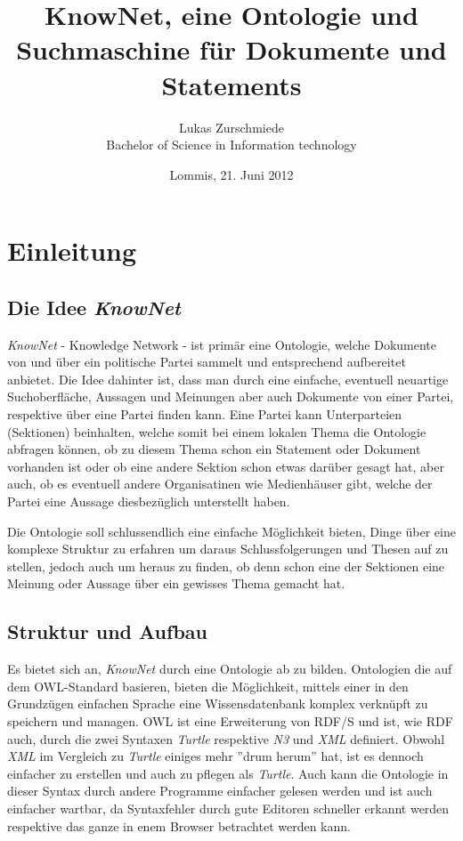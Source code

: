 \documentclass[
    11pt,
    latin1,
    a4paper,
    oneside
]{scrreprt}
\author{Lukas Zurschmiede\\Bachelor of Science in Information technology}
\date{Lommis, 21. Juni 2012}
\title{KnowNet, eine Ontologie und Suchmaschine f\"ur Dokumente und Statements}
\begin{document}
\maketitle

\newpage
\singlespacing
\tableofcontents

\pagebreak
\onehalfspacing
\setcounter{page}{1}

\chapter{Einleitung} \label{sec:introduction}

\section{Die Idee \emph{KnowNet}}

\emph{KnowNet} - Knowledge Network - ist prim\"ar eine Ontologie, welche Dokumente von und \"uber ein politische Partei sammelt und entsprechend aufbereitet anbietet. Die Idee dahinter ist, dass man durch eine einfache, eventuell neuartige Suchoberfl\"ache, Aussagen und Meinungen aber auch Dokumente von einer Partei, respektive \"uber eine Partei finden kann. Eine Partei kann Unterparteien (Sektionen) beinhalten, welche somit bei einem lokalen Thema die Ontologie abfragen k\"onnen, ob zu diesem Thema schon ein Statement oder Dokument vorhanden ist oder ob eine andere Sektion schon etwas dar\"uber gesagt hat, aber auch, ob es eventuell andere Organisatinen wie Medienh\"auser gibt, welche der Partei eine Aussage diesbez\"uglich unterstellt haben.

Die Ontologie soll schlussendlich eine einfache M\"oglichkeit bieten, Dinge \"uber eine komplexe Struktur zu erfahren um daraus Schlussfolgerungen und Thesen auf zu stellen, jedoch auch um heraus zu finden, ob denn schon eine der Sektionen eine Meinung oder Aussage \"uber ein gewisses Thema gemacht hat.

\section{Struktur und Aufbau} \label{sec:structure}

Es bietet sich an, \emph{KnowNet} durch eine Ontologie ab zu bilden. Ontologien die auf dem OWL-Standard\cite{W3COWL} basieren, bieten die M\"oglichkeit, mittels einer in den Grundz\"ugen einfachen Sprache eine Wissensdatenbank komplex verkn\"upft zu speichern und managen. OWL ist eine Erweiterung von RDF/S und ist, wie RDF auch, durch die zwei Syntaxen \emph{Turtle} respektive \emph{N3} und \emph{XML} definiert. Obwohl \emph{XML} im Vergleich zu \emph{Turtle} einiges mehr ''drum herum'' hat, ist es dennoch einfacher zu erstellen und auch zu pflegen als \emph{Turtle}. Auch kann die Ontologie in dieser Syntax durch andere Programme einfacher gelesen werden und ist auch einfacher wartbar, da Syntaxfehler durch gute Editoren schneller erkannt werden respektive das ganze in enem Browser betrachtet werden kann.
\end{document}
